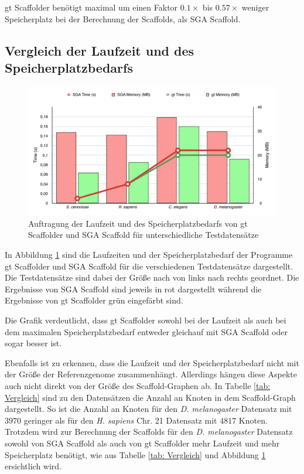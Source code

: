 \documentclass[a4paper,10pt,parskip]{scrartcl}
\begin{document}
gt Scaffolder benötigt maximal um einen Faktor $0.1\times$ bis
$0.57\times$ weniger Speicherplatz bei der Berechnung der Scaffolds,
als SGA Scaffold.

\subsection{Vergleich der Laufzeit und des Speicherplatzbedarfs}
\begin{figure}[t]
  \includegraphics[width=\textwidth,height=0.8\textheight,keepaspectratio]{presentation/figures/sga_vs_gt.pdf}
  \caption{\label{abb: Zeit}Auftragung der Laufzeit und des
    Speicherplatzbedarfs von gt Scaffolder und SGA Scaffold für
    unterschiedliche Testdatensätze}
\end{figure}

In Abbildung \ref{abb: Zeit} sind die Laufzeiten und der
Speicherplatzbedarf der Programme gt Scaffolder und SGA Scaffold für
die verschiedenen Testdatensätze dargestellt. Die Testdatensätze sind
dabei der Größe nach von links nach rechts geordnet. Die Ergebnisse
von SGA Scaffold sind jeweils in rot dargestellt während die
Ergebnisse von gt Scaffolder grün eingefärbt sind.

Die Grafik verdeutlicht, dass gt Scaffolder sowohl bei der Laufzeit
als auch bei dem maximalen Speicherplatzbedarf entweder gleichauf mit
SGA Scaffold oder sogar besser ist.

Ebenfalls ist zu erkennen, dass die Laufzeit und der
Speicherplatzbedarf nicht mit der Größe der Referenzgenome
zusammenhängt. Allerdings hängen diese Aspekte auch nicht direkt von
der Größe des Scaffold-Graphen ab. In Tabelle \ref{tab: Vergleich} sind
zu den Datensätzen die Anzahl an Knoten in dem Scaffold-Graph
dargestellt. So ist die Anzahl an Knoten für den
\textit{D. melanogaster} Datensatz mit $3970$ geringer als für den
\textit{H. sapiens} Chr. 21 Datensatz mit $4817$ Knoten. Trotzdem wird
zur Berechnung der Scaffolds für den \textit{D. melanogaster}
Datensatz sowohl von SGA Scaffold als auch von gt Scaffolder mehr
Laufzeit und mehr Speicherplatz benötigt, wie aus Tabelle \ref{tab:
  Vergleich} und Abbildung \ref{abb: Zeit} ersichtlich
wird. 
\end{document}
